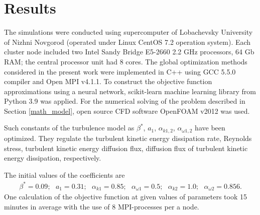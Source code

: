 \documentclass[applsci,article,submit,moreauthors,pdftex]{Definitions/mdpi}
\begin{document}
\section{Results}





The simulations were conducted using supercomputer of Lobachevsky University of Nizhni Novgorod (operated under Linux CentOS 7.2 operation system). Each cluster node included two  Intel Sandy Bridge E5-2660 2.2 GHz processors, 64 Gb RAM; the central processor unit had 8 cores. 
The global optimization methods considered in the present work were implemented in C++ using GCC 5.5.0 compiler and Open MPI v4.1.1. To construct the objective function approximations using a neural network, scikit-learn machine learning library from Python 3.9 was applied. 
For the numerical solving of the problem described in Section \ref{math_model}, open source CFD software OpenFOAM v2012 \cite{OpenFOAM} was used.

Such constants of the turbulence model as $\beta^*$, $a_1$, $\alpha_{k 1,2}$, $\alpha_{\omega 1,2}$ have been optimized. They regulate the turbulent kinetic energy dissipation rate, Reynolds stress, turbulent kinetic energy diffusion flux, diffusion flux of turbulent kinetic energy dissipation, respectively.

The initial values of the coefficients are
\begin{equation}
	\begin{aligned}
		\beta^* = 0.09;\ \ \ a_1 = 0.31;\ \ \ \alpha_{k 1} = 0.85;\ \ \ \alpha_{\omega 1} = 0.5; \ \ \ \alpha_{k 2} = 1.0;\ \ \ \alpha_{\omega 2} = 0.856.
	\end{aligned}
\end{equation}
One calculation of the objective function at given values of parameters took 15 minutes in average with the use of 8 MPI-processes per a node. 
\end{document}
